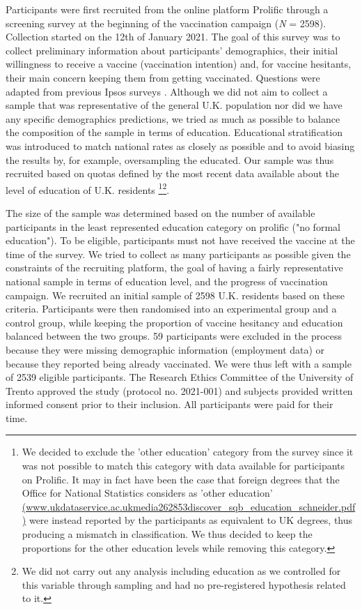 \documentclass[authordate, empirical]{jote-new-article}
\begin{document}
	Participants were first recruited from the online platform Prolific through a screening survey at the beginning of the vaccination campaign (\emph{N }= 2598). Collection started on the 12th of January 2021. The goal of this survey was to collect preliminary information about participants' demographics, their initial willingness to receive a vaccine (vaccination intention) and, for vaccine hesitants, their main concern keeping them from getting vaccinated. Questions were adapted from previous Ipsos surveys \parencites{Boyon2020}. Although we did not aim to collect a sample that was representative of the general U.K. population nor did we have any specific demographics predictions, we tried as much as possible to balance the composition of the sample in terms of education. Educational stratification was introduced to match national rates as closely as possible and to avoid biasing the results by, for example, oversampling the educated. Our sample was thus recruited based on quotas defined by the most recent data available about the level of education of U.K. residents \parencites[yOffice for][]{National Statistics2019}\footnote{ We decided to exclude the 'other education' category from the survey since it was not possible to match this category with data available for participants on Prolific. It may in fact have been the case that foreign degrees that the Office for National Statistics considers as 'other education' \href{https://www.ukdataservice.ac.uk/media/262853/discover_sqb_education_schneider.pdf}{(www.ukdataservice.ac.ukmedia262853discover\_sqb\_education\_schneider.pdf)} were instead reported by the participants as equivalent to UK degrees, thus producing a mismatch in classification. We thus decided to keep the proportions for the other education levels while removing this category.}\footnote{ We did not carry out any analysis including education as we controlled for this variable through sampling and had no pre-registered hypothesis related to it.}.



	The size of the sample was determined based on the number of available participants in the least represented education category on prolific ("no formal education"). To be eligible, participants must not have received the vaccine at the time of the survey. We tried to collect as many participants as possible given the constraints of the recruiting platform, the goal of having a fairly representative national sample in terms of education level, and the progress of vaccination campaign. We recruited an initial sample of 2598 U.K. residents based on these criteria. Participants were then randomised into an experimental group and a control group, while keeping the proportion of vaccine hesitancy and education balanced between the two groups. 59 participants were excluded in the process because they were missing demographic information (employment data) or because they reported being already vaccinated. We were thus left with a sample of 2539 eligible participants. The Research Ethics Committee of the University of Trento approved the study (protocol no. 2021-001) and subjects provided written informed consent prior to their inclusion. All participants were paid for their time.
\end{document}
